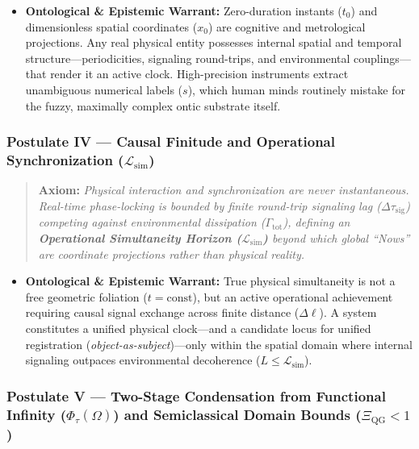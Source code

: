 \documentclass[
]{article}
\providecommand{\tightlist}{%
  \setlength{\itemsep}{0pt}\setlength{\parskip}{0pt}}
\begin{document}
\begin{itemize}
\tightlist
\item
  \textbf{Ontological \& Epistemic Warrant:} Zero-duration instants
  (\(t_0\)) and dimensionless spatial coordinates (\(x_0\)) are
  cognitive and metrological projections. Any real physical entity
  possesses internal spatial and temporal structure---periodicities,
  signaling round-trips, and environmental couplings---that render it an
  active clock. High-precision instruments extract unambiguous numerical
  labels (\(s\)), which human minds routinely mistake for the fuzzy,
  maximally complex ontic substrate itself.
\end{itemize}

\subsubsection{\texorpdfstring{Postulate IV --- Causal Finitude and
Operational Synchronization
(\(\mathcal{L}_{\mathrm{sim}}\))}{Postulate IV --- Causal Finitude and Operational Synchronization (\textbackslash mathcal\{L\}\_\{\textbackslash mathrm\{sim\}\})}}\label{postulate-iv-causal-finitude-and-operational-synchronization-mathcall_mathrmsim}

\begin{quote}
\textbf{Axiom:} \emph{Physical interaction and synchronization are never
instantaneous. Real-time phase-locking is bounded by finite round-trip
signaling lag (\(\Delta\tau_{\mathrm{sig}}\)) competing against
environmental dissipation (\(\Gamma_{\mathrm{tot}}\)), defining an
\textbf{Operational Simultaneity Horizon
(\(\mathcal{L}_{\mathrm{sim}}\))} beyond which global ``Nows'' are
coordinate projections rather than physical reality.}
\end{quote}

\begin{itemize}
\tightlist
\item
  \textbf{Ontological \& Epistemic Warrant:} True physical simultaneity
  is not a free geometric foliation (\(t = \text{const}\)), but an
  active operational achievement requiring causal signal exchange across
  finite distance (\(\Delta\ell\)). A system constitutes a unified
  physical clock---and a candidate locus for unified registration
  (\emph{object-as-subject})---only within the spatial domain where
  internal signaling outpaces environmental decoherence
  (\(L \le \mathcal{L}_{\mathrm{sim}}\)).
\end{itemize}

\subsubsection{\texorpdfstring{Postulate V --- Two-Stage Condensation
from Functional Infinity (\(\Phi_\tau(\Omega)\)) and Semiclassical
Domain Bounds
(\(\Xi_{\mathrm{QG}} < 1\))}{Postulate V --- Two-Stage Condensation from Functional Infinity (\textbackslash Phi\_\textbackslash tau(\textbackslash Omega)) and Semiclassical Domain Bounds (\textbackslash Xi\_\{\textbackslash mathrm\{QG\}\} \textless{} 1)}}\label{postulate-v-two-stage-condensation-from-functional-infinity-phi_tauomega-and-semiclassical-domain-bounds-xi_mathrmqg-1}
\end{document}
